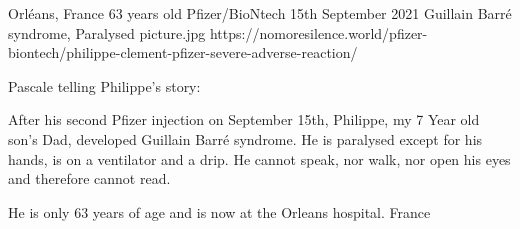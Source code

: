 {Orléans, France}
{63 years old}
{Pfizer/BioNtech}
{15th September 2021}
{Guillain Barré syndrome, Paralysed}
{picture.jpg}
{https://nomoresilence.world/pfizer-biontech/philippe-clement-pfizer-severe-adverse-reaction/}
{

Pascale telling Philippe’s story:

After his second Pfizer injection on September 15th, Philippe, my 7 Year old
son’s Dad, developed Guillain Barré syndrome. He is paralysed except for his
hands, is on a ventilator and a drip. He cannot speak, nor walk, nor open his
eyes and therefore cannot read.

He is only 63 years of age and is now at the Orleans hospital.
France
}

